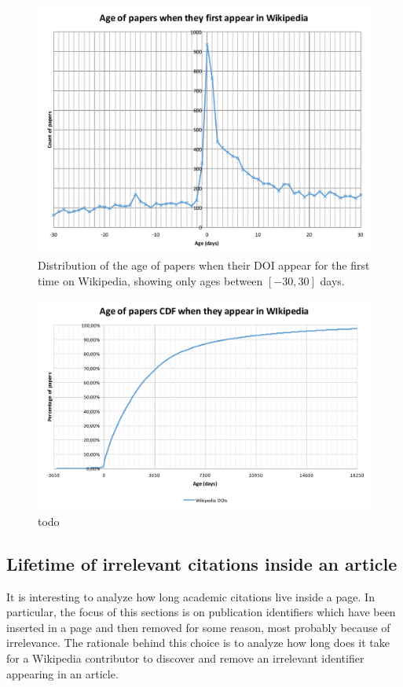 \begin{figure}[h]
\centering
\includegraphics[keepaspectratio=true, width=\textwidth]{assets/age_of_papers_at_first_appearance_-30+30}
\caption{Distribution of the age of papers when their DOI appear for the first time on Wikipedia, showing only ages between $[-30, 30]$ days.}
\label{fig:age_of_papers_at_first_appearance_zoom}
\end{figure}

\begin{figure}[h]
\centering
\includegraphics[keepaspectratio=true, width=\textwidth]{assets/age_of_papers_at_first_appearance_cdf}
\caption{todo}
\label{fig:age_of_papers_at_first_appearance_cdf}
\end{figure}


\subsection{Lifetime of irrelevant citations inside an article}
It is interesting to analyze how long academic citations live inside a page.
In particular, the focus of this sections is on publication identifiers which have been inserted in a page and then removed for some reason, most probably because of irrelevance.
The rationale behind this choice is to analyze how long does it take for a Wikipedia contributor to discover and remove an irrelevant identifier appearing in an article.

